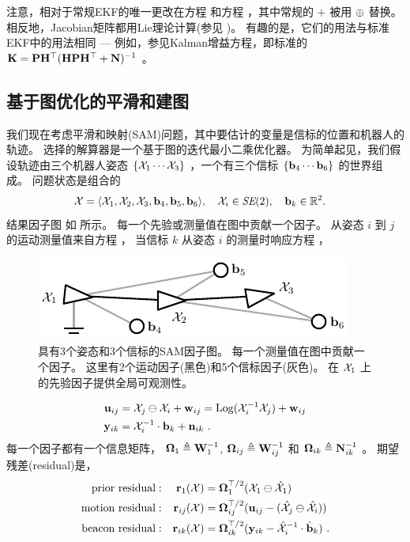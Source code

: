 注意，相对于常规EKF的唯一更改在方程  和方程 ，其中常规的 $+$ 被用 $\oplus$ 替换。
相反地，Jacobian矩阵都用Lie理论计算(参见 )。
有趣的是，它们的用法与标准EKF中的用法相同 --- 例如，参见Kalman增益方程，即标准的 ${\bf K} = {\bf P}{\bf H}^{\top}({\bf H}{\bf P}{\bf H}^{\top}+{\bf N})^{-1}$ 。


\subsection{基于图优化的平滑和建图}
\label{sec:SAM}

我们现在考虑平滑和映射(SAM)问题，其中要估计的变量是信标的位置和机器人的轨迹。
选择的解算器是一个基于图的迭代最小二乘优化器。
为简单起见，我们假设轨迹由三个机器人姿态 $\{\mathcal{X}_1\cdots\mathcal{X}_3\}$ ，一个有三个信标 $\{{\bf b}_4\cdots{\bf b}_6\}$ 的世界组成。
问题状态是组合的
%
\begin{align}\label{equ:SAM_state}
\mathcal{X} &= \langle
\mathcal{X}_1 , \mathcal{X}_2 , \mathcal{X}_3 , {\bf b}_4 , {\bf b}_5 , {\bf b}_6
\rangle, \quad \mathcal{X}_i\in\textit{SE}(2),\quad{\bf b}_k\in{\mathbb R}^2.
\end{align}
%
结果因子图 \cite{DELLAERT-IJRR-06} 如  所示。
每一个先验或测量值在图中贡献一个因子。
从姿态 $i$ 到 $j$ 的运动测量值来自方程 ，
当信标 $k$ 从姿态 $i$ 的测量时响应方程 ，
%
\begin{figure}
\centering
\includegraphics{figures/SAM}
\caption{具有3个姿态和3个信标的SAM因子图。
每一个测量值在图中贡献一个因子。
这里有2个运动因子(黑色)和5个信标因子(灰色)。
在 $\mathcal{X}_1$ 上的先验因子提供全局可观测性。}
\label{fig:graph-SLAM}
\end{figure}
%
%
\begin{align}
{\bf u}_{ij} &= \mathcal{X}_j\ominus\mathcal{X}_i + {\bf w}_{ij} = \operatorname*{Log}(\mathcal{X}_i^{-1}\mathcal{X}_j) + {\bf w}_{ij} \label{equ:meas_motion} \\
{\bf y}_{ik} &= \mathcal{X}_i^{-1}\cdot{\bf b}_k + {\bf n}_{ik}
~.
\end{align}
%
每一个因子都有一个信息矩阵， ${\bm \Omega}_{1} \triangleq {\bf W}_{1}^{-1}$, ${\bm \Omega}_{ij} \triangleq {\bf W}_{ij}^{-1}$ 和 ${\bm \Omega}_{ik} \triangleq {\bf N}_{ik}^{-1}$ 。
%
期望残差(residual)是，
%
\begin{align}
\textrm{prior residual}&:&{\bf r}_{1}(\mathcal{X}) &= {\bm \Omega}_{1}^{\top/2}(\mathcal{X}_1 \ominus \hat{\mathcal{X}}_1)
\notag
\\
\textrm{motion residual}&:&{\bf r}_{ij}(\mathcal{X}) &= {\bm \Omega}_{ij}^{\top/2}({\bf u}_{ij} - (\hat{\mathcal{X}}_j\ominus\hat{\mathcal{X}}_i))
\notag
\\
\textrm{beacon residual}&:&{\bf r}_{ik}(\mathcal{X}) &= {\bm \Omega}_{ik}^{\top/2}({\bf y}_{ik} - \hat{\mathcal{X}}_i^{-1}\cdot\hat{{\bf b}}_k)
\notag
~.
\end{align}
